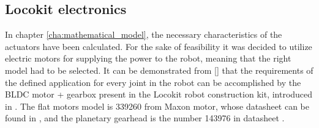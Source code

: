 
\subsection{Locokit electronics} %
\label{sub:locokit_electronics}
In chapter \ref{cha:mathematical_model}, the necessary characteristics of the actuators have been calculated.
For the sake of feasibility it was decided to utilize electric motors for supplying the power to the robot, meaning that the right model had to be selected.
It can be demonstrated from \ref{} %
that the requirements of the defined application for every joint in the robot can be accomplished by the BLDC motor + gearbox present in the Locokit robot construction kit, introduced in \cite{locokit}.
The flat motors model is 339260 from Maxon motor, whose datasheet can be found in \cite{maxon_motor}, and the planetary gearhead is the number 143976 in datasheet \cite{maxon_gear}.

